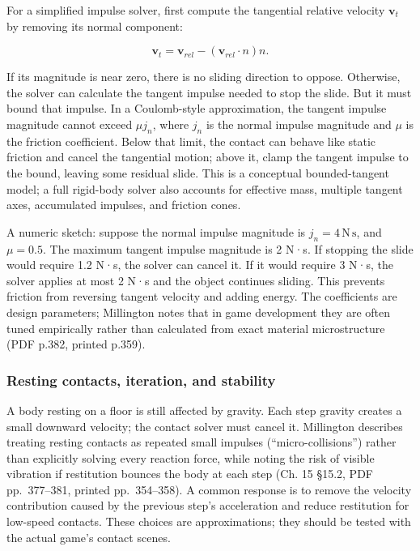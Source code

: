 For a simplified impulse solver, first compute the tangential relative velocity \(\mathbf{v}_t\) by removing its normal component:

\[
\mathbf{v}_t=\mathbf{v}_{rel}-(\mathbf{v}_{rel}\cdot n)n.
\]

If its magnitude is near zero, there is no sliding direction to oppose. Otherwise, the solver can calculate the tangent impulse needed to stop the slide. But it must bound that impulse. In a Coulomb-style approximation, the tangent impulse magnitude cannot exceed \(\mu j_n\), where \(j_n\) is the normal impulse magnitude and \(\mu\) is the friction coefficient. Below that limit, the contact can behave like static friction and cancel the tangential motion; above it, clamp the tangent impulse to the bound, leaving some residual slide. This is a conceptual bounded-tangent model; a full rigid-body solver also accounts for effective mass, multiple tangent axes, accumulated impulses, and friction cones.

A numeric sketch: suppose the normal impulse magnitude is \(j_n=4\,\mathrm{N\,s}\), and \(\mu=0.5\). The maximum tangent impulse magnitude is 2 N·s. If stopping the slide would require 1.2 N·s, the solver can cancel it. If it would require 3 N·s, the solver applies at most 2 N·s and the object continues sliding. This prevents friction from reversing tangent velocity and adding energy. The coefficients are design parameters; Millington notes that in game development they are often tuned empirically rather than calculated from exact material microstructure (PDF p.382, printed p.359).

\subsubsection{Resting contacts, iteration, and stability}\label{06-engine-ii-ch033-resting-contacts-iteration-and-stability}

\hypertarget{06-engine-ii-ch033-resting-contacts-iteration-and-stability}{}

A body resting on a floor is still affected by gravity. Each step gravity creates a small downward velocity; the contact solver must cancel it. Millington describes treating resting contacts as repeated small impulses (``micro-collisions'') rather than explicitly solving every reaction force, while noting the risk of visible vibration if restitution bounces the body at each step (Ch. 15 §15.2, PDF pp.~377--381, printed pp.~354--358). A common response is to remove the velocity contribution caused by the previous step's acceleration and reduce restitution for low-speed contacts. These choices are approximations; they should be tested with the actual game's contact scenes.

